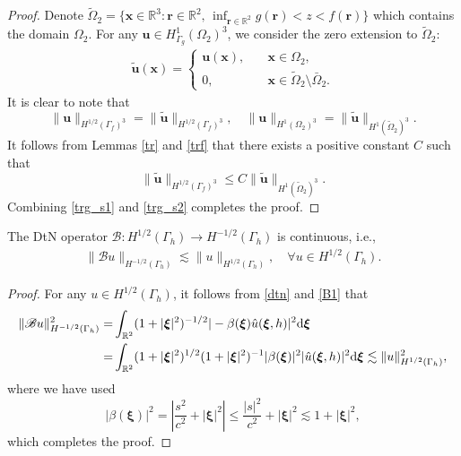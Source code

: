 \documentclass[final,leqno]{siamltex}
\begin{document}
\begin{proof}
 Denote $\tilde{\Omega}_2=\{\boldsymbol{x}\in\mathbb{R}^3:
\boldsymbol{r}\in\mathbb{R}^2,\, \inf_{{\boldsymbol
r}\in\mathbb{R}^2}g(\boldsymbol{r})<z<f(\boldsymbol r)\}$ which contains the
domain $\Omega_2$. For any $\boldsymbol{u}\in H^1_{\Gamma_g}(\Omega_2)^3$, we
consider the zero extension to $\tilde{\Omega}_2$:
\begin{align*}
 \tilde{\boldsymbol u} (\boldsymbol x)=
 \begin{cases}
  \boldsymbol{u} (\boldsymbol x), \quad  &\boldsymbol x \in
\Omega_2,\\
  0, \quad  & \boldsymbol x \in \tilde{\Omega}_2 \setminus \bar{\Omega}_2.
  \end{cases}
\end{align*}
It is clear to note that
\begin{equation}\label{trg_s1}
 \|\boldsymbol{u}\|_{H^{1/2}(\Gamma_f)^3}=\|\tilde{\boldsymbol u}\|_{H^{1/2}
(\Gamma_f)^3},\quad \|\boldsymbol{u}\|_{H^1(\Omega_2)^3}=\|\tilde{\boldsymbol
u}\|_{H^1(\tilde{\Omega}_2)^3}.
\end{equation}
It follows from Lemmas \ref{tr} and \ref{trf} that there exists a positive
constant $C$ such that
\begin{equation}\label{trg_s2}
 \|\tilde{\boldsymbol u}\|_{H^{1/2} (\Gamma_f)^3}\leq C\|\tilde{\boldsymbol
u}\|_{H^1(\tilde{\Omega}_2)^3}.
\end{equation}
Combining \eqref{trg_s1} and \eqref{trg_s2} completes the proof.
\end{proof}

\begin{lemma}\label{cc}
 The DtN operator $\mathscr{B}: H^{1/2} (\Gamma_h) \to H^{-1/2}
(\Gamma_h)$ is continuous, i.e.,
 \begin{align*}
  \|\mathscr{B}u\|_{H^{-1/2} (\Gamma_h)} \lesssim \| u\|_{H^{1/2}
(\Gamma_h)},\quad\forall u\in H^{1/2} (\Gamma_h).
 \end{align*}
\end{lemma}

\begin{proof}
 For any $u \in H^{1/2} (\Gamma_h)$, it follows from \eqref{dtn} and
\eqref{B1} that
 \begin{align*}
  \|\mathscr{B} u\|^2_{H^{-1/2} (\Gamma_h)}
  =&\int_{\mathbb R^2} (1+|\boldsymbol \xi| ^2) ^{-1/2} | -\beta (\boldsymbol
\xi) \hat  u ( \boldsymbol \xi, h) |^2 {\rm d} \boldsymbol \xi\\
  = &\int_{\mathbb R^2} (1+|\boldsymbol \xi|^2)^{1/2}
  (1+|\boldsymbol \xi|^2)^{-1} |\beta ( \boldsymbol \xi)|^2 |\hat u
(\boldsymbol\xi, h)|^2 {\rm d} \boldsymbol  \xi
  \lesssim \|u\|^2_{H^{1/2} (\Gamma_h)},
 \end{align*}
where we have used
\[
 |\beta (\boldsymbol \xi)|^2 = \left|\frac{s^2}{c^2} + |\boldsymbol \xi|^2
\right| \leq \frac{|s|^2}{c^2} + |\boldsymbol \xi|^2 \lesssim 1+ |\boldsymbol
\xi|^2,
\]
which completes the proof.
\end{proof}
\end{document}
